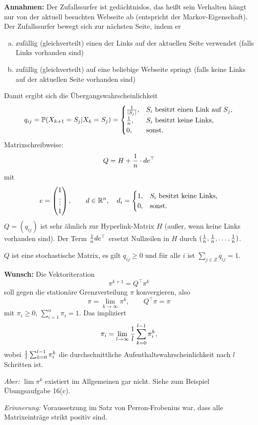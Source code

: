 \textbf{Annahmen:} Der Zufallssurfer ist gedächtnislos, das heißt sein Verhalten
hängt nur von der aktuell besuchten Webseite ab (entspricht der
Markov-Eigenschaft). Der Zufallssurfer bewegt sich zur nächsten Seite, indem er
\begin{enumerate}[a)]
\item zufällig (gleichverteilt) einen der Links auf der aktuellen Seite
  verwendet (falls Links vorhanden sind)
\item zufällig (gleichverteilt) auf eine beliebige Webseite springt (falls
  keine Links auf der aktuellen Seite vorhanden sind)
\end{enumerate}

Damit ergibt sich die Übergangswahrscheinlichkeit
\[ q_{ij} = \mathbb{P}( X_{k+1} = S_j | X_k = S_j ) =
  \begin{cases}
    \frac{1}{|S_j|}, & S_i \text{ besitzt einen Link auf } S_j, \\
    \frac{1}{n}, & S_i \text{ besitzt keine Links,} \\
    0, & \text{sonst.}
  \end{cases}
\]
Matrixschreibweise:
\[ Q = H + \frac{1}{n} \cdot d e^\top \]
mit
\[ e = \begin{pmatrix}1 \\ \vdots \\ 1\end{pmatrix}, \qquad d
  \in \mathbb{R}^n, \quad
  d_i = \begin{cases}
    1, & S_i \text{ besitzt keine Links,} \\
    0, & \text{sonst.}
  \end{cases}
\]
$Q = (q_{ij})$ ist sehr ähnlich zur Hyperlink-Matrix $H$ (außer, wenn keine
Links vorhanden sind). Der Term $\frac{1}{n} d e^\top$ ersetzt Nullzeilen in $H$
durch $(\frac{1}{n}, \frac{1}{n}, \ldots, \frac{1}{n})$.

$Q$ ist eine stochastische Matrix, es gilt $q_{ij} \ge 0$ und für alle $i$ ist
$\sum_{j \in Z} q_{ij} = 1$.

\textbf{Wunsch:} Die Vektoriteration
\[ \pi^{k+1} = Q^\top \pi^k \]
soll gegen die stationäre Grenzverteilung $\pi$ konvergieren, also
\[ \pi = \lim_{k \to \infty} \pi^k, \qquad Q^\top \pi = \pi \]
mit $\pi_i \ge 0$, $\sum_{i=1}^n \pi_i = 1$. Das impliziert
\[ \pi_i = \lim_{l \to \infty} \frac{1}{l} \sum_{k=0}^{l-1} \pi_i^k, \]
wobei $\frac{1}{l} \sum_{k=0}^{l-1} \pi_i^k$ die durchschnittliche
Aufenthaltswahrscheinlichkeit nach $l$ Schritten ist.

\emph{Aber:} $\lim \pi^k$ existiert im Allgemeinen gar nicht. Siehe zum Beispiel
Übungsaufgabe 16(c).

\emph{Erinnerung:} Voraussetzung im Satz von Perron-Frobenius war, dass alle
Matrixeinträge strikt positiv sind.

